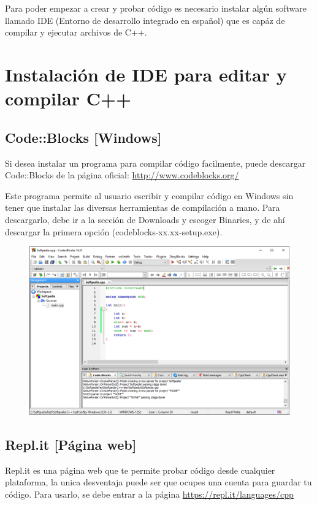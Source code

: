 \documentclass{article}
\begin{document}
Para poder empezar a crear y probar código es necesario instalar algún software llamado IDE (Entorno de desarrollo integrado en español) que es capáz de compilar y ejecutar archivos de C++.

\section{Instalación de IDE para editar y compilar C++}

\subsection{Code::Blocks [Windows]}
Si desea instalar un programa para compilar código facilmente, puede descargar Code::Blocks de la página oficial: \url{http://www.codeblocks.org/}

Este programa permite al usuario escribir y compilar código en Windows sin tener que instalar las diversas herramientas de compilación a mano. Para descargarlo, debe ir a la sección de Downloads y escoger Binaries, y de ahí descargar la primera opción (codeblocks-xx.xx-setup.exe).

\begin{figure}[H]
    \centering
    \includegraphics[width=0.5\paperwidth]{CodeBlocks}
\end{figure}

\subsection{Repl.it [Página web]}
Repl.it es una página web que te permite probar código desde cualquier plataforma, la unica desventaja puede ser que ocupes una cuenta para guardar tu código. Para usarlo, se debe entrar a la página \url{https://repl.it/languages/cpp}
\end{document}

